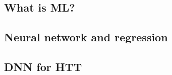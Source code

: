 \subsection*{What is ML?}


\subsection*{Neural network and regression}






%
%
%
%

\subsection*{DNN for HTT}

